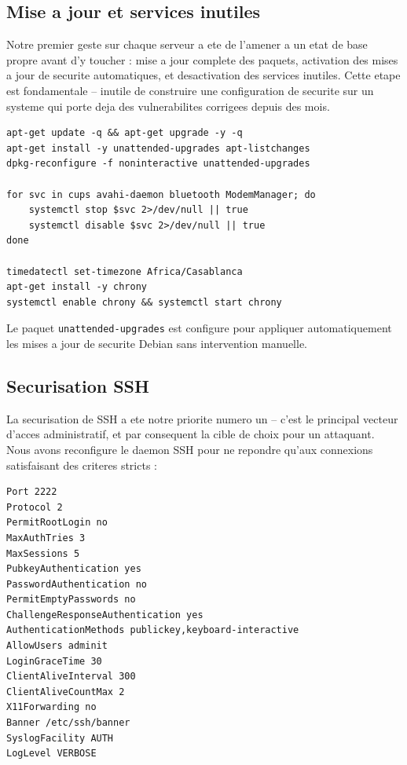 \documentclass[11pt,a4paper]{article}
\begin{document}
\subsection{Mise a jour et services inutiles}

Notre premier geste sur chaque serveur a ete de l'amener a un etat de base propre avant d'y toucher : mise a jour complete des paquets, activation des mises a jour de securite automatiques, et desactivation des services inutiles. Cette etape est fondamentale -- inutile de construire une configuration de securite sur un systeme qui porte deja des vulnerabilites corrigees depuis des mois.

\begin{lstlisting}[caption={Mise a jour et desactivation des services inutiles}]
apt-get update -q && apt-get upgrade -y -q
apt-get install -y unattended-upgrades apt-listchanges
dpkg-reconfigure -f noninteractive unattended-upgrades

for svc in cups avahi-daemon bluetooth ModemManager; do
    systemctl stop $svc 2>/dev/null || true
    systemctl disable $svc 2>/dev/null || true
done

timedatectl set-timezone Africa/Casablanca
apt-get install -y chrony
systemctl enable chrony && systemctl start chrony
\end{lstlisting}

Le paquet \texttt{unattended-upgrades} est configure pour appliquer automatiquement les mises a jour de securite Debian sans intervention manuelle.

\subsection{Securisation SSH}

La securisation de SSH a ete notre priorite numero un -- c'est le principal vecteur d'acces administratif, et par consequent la cible de choix pour un attaquant. Nous avons reconfigure le daemon SSH pour ne repondre qu'aux connexions satisfaisant des criteres stricts :

\begin{lstlisting}[caption={Extrait de /etc/ssh/sshd\_config applique}]
Port 2222
Protocol 2
PermitRootLogin no
MaxAuthTries 3
MaxSessions 5
PubkeyAuthentication yes
PasswordAuthentication no
PermitEmptyPasswords no
ChallengeResponseAuthentication yes
AuthenticationMethods publickey,keyboard-interactive
AllowUsers adminit
LoginGraceTime 30
ClientAliveInterval 300
ClientAliveCountMax 2
X11Forwarding no
Banner /etc/ssh/banner
SyslogFacility AUTH
LogLevel VERBOSE
\end{lstlisting}
\end{document}
